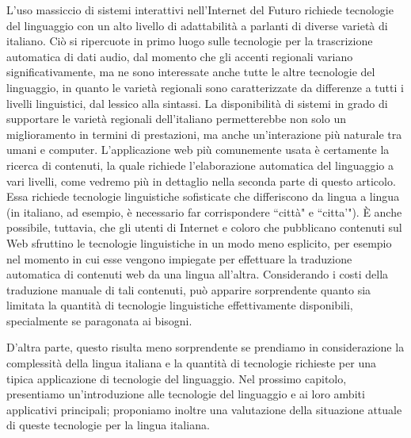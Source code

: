 \documentclass[]{../../metanetpaper}
\begin{document}
\begin{multicols}{2}

L'uso massiccio di sistemi interattivi nell'Internet del Futuro richiede
tecnologie del linguaggio con un alto livello di adattabilit\`{a} a parlanti
di diverse variet\`{a} di italiano. Ci\`{o} si ripercuote in primo luogo sulle
tecnologie per la trascrizione automatica di dati audio, dal momento che gli
accenti regionali variano significativamente, ma ne sono interessate anche
tutte le altre tecnologie del linguaggio, in quanto le variet\`{a} regionali
sono caratterizzate da differenze a tutti i livelli linguistici, dal lessico
alla sintassi. La disponibilit\`{a} di sistemi in grado di supportare le
variet\`{a} regionali dell'italiano permetterebbe non solo un miglioramento in
termini di prestazioni, ma anche un'interazione pi\`{u} naturale tra umani e
computer.
L'applicazione web pi\`{u} comunemente usata \`{e} certamente la ricerca di
contenuti, la quale richiede l'elaborazione automatica del linguaggio a vari
livelli, come vedremo pi\`{u} in dettaglio nella seconda parte di questo
articolo. Essa richiede tecnologie linguistiche sofisticate che differiscono
da lingua a lingua (in italiano, ad esempio, \`{e} necessario far
corrispondere “citt\`{a}" e “citta'"). \`{E} anche possibile, tuttavia, che
gli utenti di Internet e coloro che pubblicano contenuti sul Web sfruttino le
tecnologie linguistiche in un modo meno esplicito, per esempio nel momento in
cui esse vengono impiegate per effettuare la traduzione automatica di
contenuti web da una lingua all'altra. Considerando i costi della traduzione
manuale di tali contenuti, pu\`{o} apparire sorprendente quanto sia limitata
la quantit\`{a} di tecnologie linguistiche effettivamente disponibili,
specialmente se paragonata ai bisogni.

D'altra parte, questo risulta meno sorprendente se prendiamo in considerazione
la complessit\`{a} della lingua italiana e la quantit\`{a} di tecnologie
richieste per una tipica applicazione di tecnologie del linguaggio. Nel
prossimo capitolo, presentiamo un'introduzione alle tecnologie del linguaggio
e ai loro ambiti applicativi principali; proponiamo inoltre una valutazione
della situazione attuale di queste tecnologie per la lingua
italiana.



\end{multicols}
\end{document}
